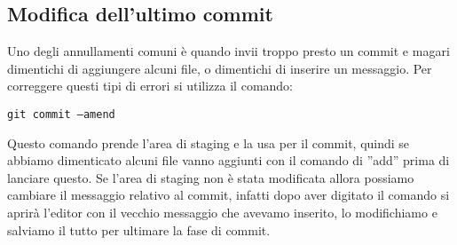 \subsection{Modifica dell'ultimo commit}
Uno degli annullamenti comuni è quando invii troppo presto un commit e magari dimentichi di aggiungere alcuni file, o dimentichi di inserire un messaggio. Per correggere questi tipi di errori si utilizza il comando:

\begin{center}
\texttt{git commit --amend}
\end{center}

Questo comando prende l'area di staging e la usa per il commit, quindi se abbiamo dimenticato alcuni file vanno aggiunti con il comando di ''add'' prima di lanciare questo. Se l'area di staging non è stata modificata allora possiamo cambiare il messaggio relativo al commit, infatti dopo aver digitato il comando si aprirà l'editor con il vecchio messaggio che avevamo inserito, lo modifichiamo e salviamo il tutto per ultimare la fase di commit.